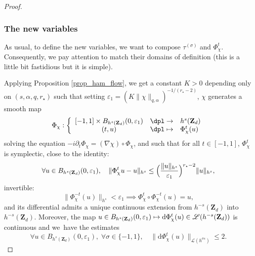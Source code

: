 \documentclass[JEP,XML,SOM,Unicode,NoEqCountersInSection,published]{cedram}
\newcommand\mto{\mathchoice{\longmapsto}{\mapsto}{\mapsto}{\mapsto}}
\theoremstyle{definition}
\begin{document}
\begin{proof}
\subsubsection*{The new variables}
As usual, to define the new variables, we want to compose $\tau^{(\sigma)}$ and $\Phi_\chi^t$. Consequently, we pay attention to match their domains of definition (this is a little bit fastidious but it is simple).

Applying Proposition \ref{prop_ham_flow}, we get a constant $K>0$ depending only on $(s,\alpha,q,r_\star)$ such that setting $\varepsilon_1 = (K \|\chi \|_{q,\alpha})^{-1/(r_\star-2)}$, $\chi$ generates a smooth map
\[
\Phi_\chi: \left\{ \begin{array}{cll} [-1,1] \times B_{h^s(\mathbf{Z}_d)}(0,\varepsilon_1) &\dpl\to& h^s(\mathbf{Z}_d) \\ (t,u) &\dpl\mto& \Phi_\chi^t(u) \end{array} \right.
\]
solving the equation
$
-i\partial_t \Phi_\chi = (\nabla \chi)\circ \Phi_\chi$,
and such that for all $t\in [-1,1]$, $\Phi_\chi^t$ is symplectic, close to the identity:
\begin{equation}
\label{eq_dindon_new}
\forall u \in B_{h^s(\mathbf{Z}_d)}(0,\varepsilon_1), \quad \| \Phi_\chi^t u - u \|_{h^s} \leq \Bigl(\frac{\| u \|_{h^s}}{\varepsilon_1}\Bigr)^{r_\star-2} \| u \|_{h^s},
\end{equation}
invertible:
\begin{equation}
\label{eq_invertibility_new}
\|\Phi_\chi^{-t} (u) \|_{h^s} < \varepsilon_1 \implies \Phi_\chi^{t}\circ \Phi_\chi^{-t} (u) = u,
\end{equation}
and its differential admits a unique continuous extension from $h^{-s}(\mathbf{Z}_d)$ into $h^{-s}(\mathbf{Z}_d)$. Moreover, the map $u\in B_{h^s(\mathbf{Z}_d)}(0,\varepsilon_1) \mto \mathrm{d} \Phi_\chi^t(u) \in \mathscr{L}(h^{-s}(\mathbf{Z}_d))$ is continuous and we~have the estimates
\begin{equation}
\label{eq_petanque_new}
\forall u \in B_{h^s(\mathbf{Z}_d)}(0,\varepsilon_1),\;\forall \sigma\in \{-1,1\},\quad \| \mathrm{d} \Phi_\chi^t (u)\|_{\mathscr{L}(h^{\sigma s})}\leq 2.
\end{equation}


\end{proof}
\end{document}
